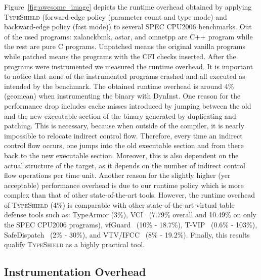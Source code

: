 Figure~\ref{fig:awesome_image} depicts the runtime overhead obtained by applying \textsc{TypeShield} (forward-edge policy (parameter count and type mode) and backward-edge policy (fast mode))
to several SPEC CPU2006 benchmarks. Out of the used programs:
xalanckbmk, astar, and omnetpp are C++ program while the rest are pure C programs. 
Unpatched means the original vanilla programs while patched means the programs with the CFI checks inserted.
After the programs were instrumented we measured the runtime overhead. It is important to notice that none of the 
instrumented programs crashed and all executed as intended by the benchmark.
The obtained runtime overhead is around 4\% (geomean) when instrumenting the binary with DynInst. 
One reason for the performance drop includes cache misses introduced by jumping between the old and the new executable section 
of the binary generated by duplicating and patching. This is necessary, because when
outside of the compiler, it is nearly impossible to relocate indirect control flow. Therefore, 
every time an indirect control flow occurs, one jumps into the old executable section and from 
there back to the new executable section. Moreover, this is also dependent on the actual structure 
of the target, as it depends on the number of indirect control flow operations per time unit.
Another reason for the slightly higher (yer acceptable) performance overhead is due to our
runtime policy which is more complex than that of other state-of-the-art tools.
However, the runtime overhead of \textsc{TypeShield} (4\%) is comparable with other state-of-the-art virtual table defense
tools such as: TypeArmor (3\%), VCI~\cite{vci:asiaccs} (7.79\% overall and 10.49\% on only the SPEC CPU2006 programs), vfGuard~\cite{vfuard:aravind} (10\% - 18.7\%), T-VIP~\cite{gawlik} (0.6\% - 103\%), 
SafeDispatch~\cite{safedispatch:jang} (2\% - 30\%), and VTV/IFCC~\cite{vtv:tice} (8\% - 19.2\%).
Finally, this results qualify \textsc{TypeShield} as a highly practical tool.


\subsection{Instrumentation Overhead}
\label{section:typeshieldoverheadinstrumentation}


